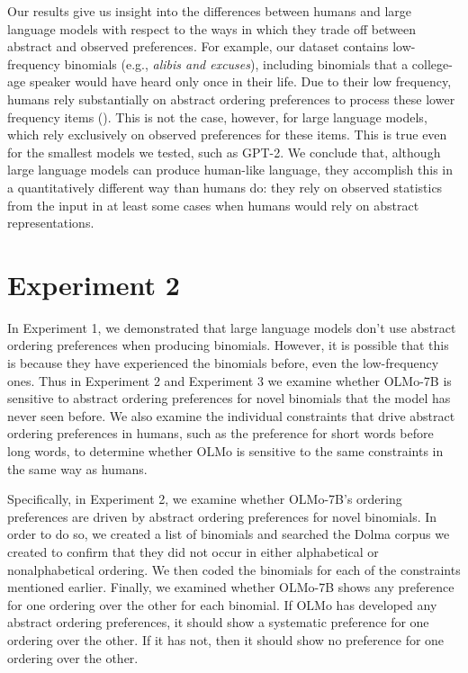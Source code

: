 \documentclass[
  12pt,
  letterpaper,
]{scrreprt}
\begin{document}
Our results give us insight into the differences between humans and
large language models with respect to the ways in which they trade off
between abstract and observed preferences. For example, our dataset
contains low-frequency binomials (e.g., \emph{alibis and excuses}),
including binomials that a college-age speaker would have heard only
once in their life. Due to their low frequency, humans rely
substantially on abstract ordering preferences to process these lower
frequency items (). This
is not the case, however, for large language models, which rely
exclusively on observed preferences for these items. This is true even
for the smallest models we tested, such as GPT-2. We conclude that,
although large language models can produce human-like language, they
accomplish this in a quantitatively different way than humans do: they
rely on observed statistics from the input in at least some cases when
humans would rely on abstract representations.

\section{Experiment 2}\label{experiment-2-1}

In Experiment 1, we demonstrated that large language models don't use
abstract ordering preferences when producing binomials. However, it is
possible that this is because they have experienced the binomials
before, even the low-frequency ones. Thus in Experiment 2 and Experiment
3 we examine whether OLMo-7B is sensitive to abstract ordering
preferences for novel binomials that the model has never seen before. We
also examine the individual constraints that drive abstract ordering
preferences in humans, such as the preference for short words before
long words, to determine whether OLMo is sensitive to the same
constraints in the same way as humans.

Specifically, in Experiment 2, we examine whether OLMo-7B's ordering
preferences are driven by abstract ordering preferences for novel
binomials. In order to do so, we created a list of binomials and
searched the Dolma corpus we created to confirm that they did not occur
in either alphabetical or nonalphabetical ordering. We then coded the
binomials for each of the constraints mentioned earlier. Finally, we
examined whether OLMo-7B shows any preference for one ordering over the
other for each binomial. If OLMo has developed any abstract ordering
preferences, it should show a systematic preference for one ordering
over the other. If it has not, then it should show no preference for one
ordering over the other.
\end{document}
